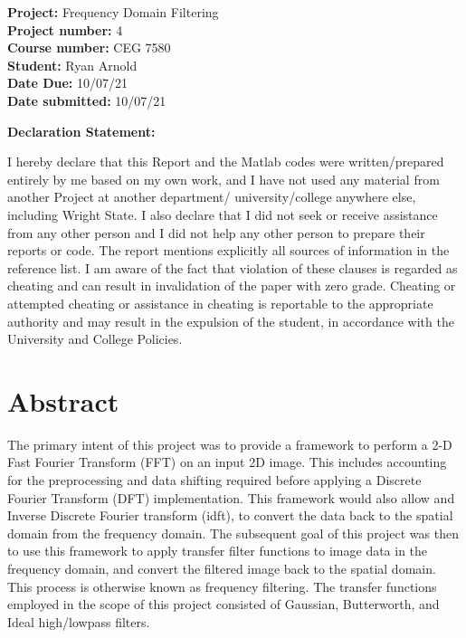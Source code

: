 \documentclass[./rarnold_report4.tex]{subfiles}
\begin{document}


\begin{titlepage}

\noindent
\textbf{Project:} Frequency Domain Filtering \\
\textbf{Project number:} 4\\
\textbf{Course number:} CEG 7580\\
\textbf{Student:} Ryan Arnold \\
\textbf{Date Due:} 10/07/21 \\
\textbf{Date submitted:} 10/07/21
\vspace{24pt}

\noindent \textbf{Declaration Statement: }

\noindent I hereby declare that this Report and the Matlab codes were written/prepared entirely by me based on my own work, and I have not used any material from another Project at another department/ university/college anywhere else, including Wright State. I also declare that I did not seek or receive assistance from any other person and I did not help any other person to prepare their reports or code.  The report mentions explicitly all sources of information in the reference list. I am aware of the fact that violation of these clauses is regarded as cheating and can result in invalidation of the paper with zero grade. Cheating or attempted cheating or assistance in cheating is reportable to the appropriate authority and may result in the expulsion of the student, in accordance with the University and College Policies.

\end{titlepage}

\clearpage
\section*{Abstract}

\noindent The primary intent of this project was to provide a framework to perform a 2-D Fast Fourier Transform (FFT) on an input 2D image.  This includes accounting for the preprocessing and data shifting  required before applying a Discrete Fourier Transform (DFT) implementation.  This framework would also allow and Inverse Discrete Fourier transform (idft), to convert the data back to the spatial domain from the frequency domain.  The subsequent goal of this project was then to use this framework to apply transfer filter functions to image data in the frequency domain, and convert the filtered image back to the spatial domain.  This process is otherwise known as frequency filtering.  The transfer functions employed in the scope of this project consisted of Gaussian, Butterworth, and Ideal high/lowpass filters.
\end{document}
